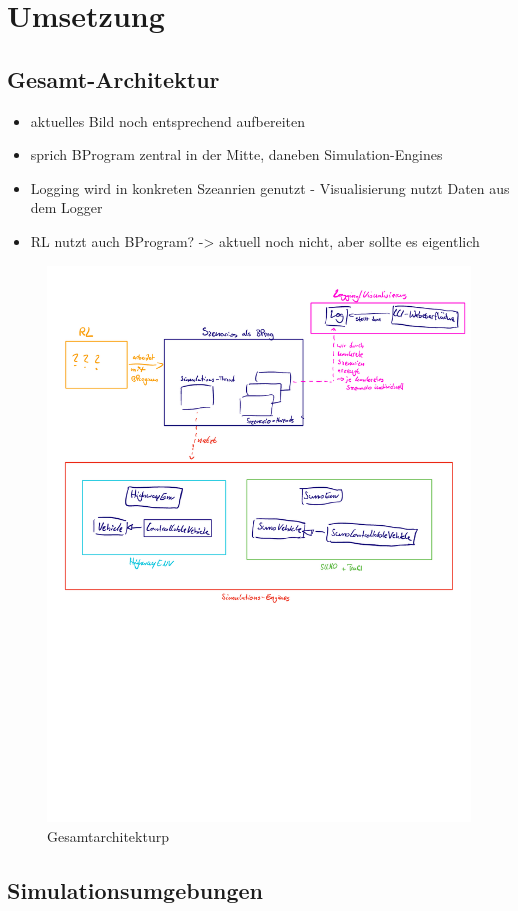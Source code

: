 \chapter{Umsetzung}

\section{Gesamt-Architektur}
\begin{itemize}
    \item aktuelles Bild noch entsprechend aufbereiten
    \item sprich BProgram zentral in der Mitte, daneben Simulation-Engines
    \item Logging wird in konkreten Szeanrien genutzt - Visualisierung nutzt Daten aus dem Logger
    \item RL nutzt auch BProgram? -> aktuell noch nicht, aber sollte es eigentlich
\end{itemize}
\begin{figure}[h]
    \centering
    \includegraphics[width=0.8\linewidth]{contents/figures/architecture.pdf}
    \caption{Gesamtarchitekturp}
    \label{fig:architecture}
\end{figure}
\section{Simulationsumgebungen}
